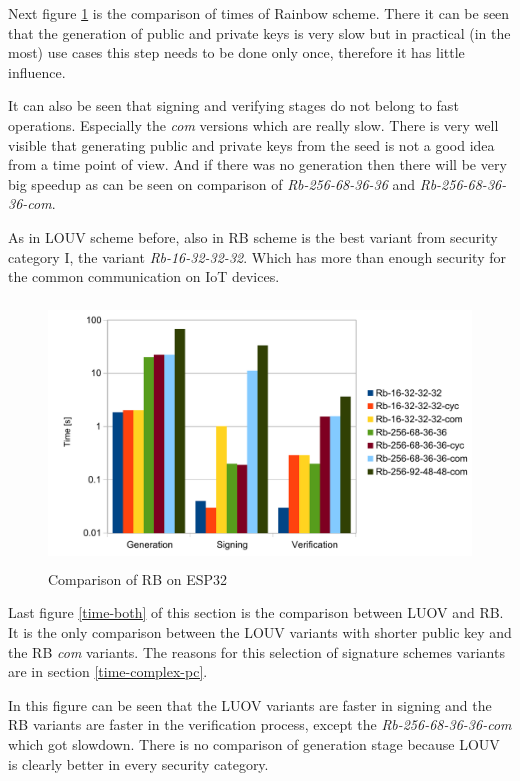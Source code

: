 \documentclass[thesis=M,english]{FITthesis}[2019/12/23]
\begin{document}
Next figure \ref{time-rb} is the comparison of times of Rainbow scheme. There it can be seen that the generation of public and private keys is very slow but in practical (in the most) use cases this step needs to be done only once, therefore it has little influence.

\bigskip
\noindent
It can also be seen that signing and verifying stages do not belong to fast operations. Especially the \textit{com} versions which are really slow. There is very well visible that generating public and private keys from the seed is not a good idea from a time point of view. And if there was no generation then there will be very big speedup as can be seen on comparison of \textit{Rb-256-68-36-36} and \textit{Rb-256-68-36-36-com}.

\bigskip
\noindent
As in LOUV scheme before, also in RB scheme is the best variant from security category I, the variant \textit{Rb-16-32-32-32}. Which has more than enough security for the common communication on IoT devices.

\begin{figure}[H]
\centering
\includegraphics[width=13cm,height=7cm]{images/time-rb.pdf}
\caption{Comparison of RB on ESP32}
\label{time-rb}
\end{figure}

\noindent
Last figure \ref{time-both} of this section is the comparison between LUOV and RB. It is the only comparison between the LOUV variants with shorter public key and the RB \textit{com} variants. The reasons for this selection of signature schemes variants are in section \ref{time-complex-pc}.

\bigskip
\noindent
In this figure can be seen that the LUOV variants are faster in signing and the RB variants are faster in the verification process, except the \textit{Rb-256-68-36-36-com} which got slowdown. There is no comparison of generation stage because LOUV is clearly better in every security category.
\end{document}
